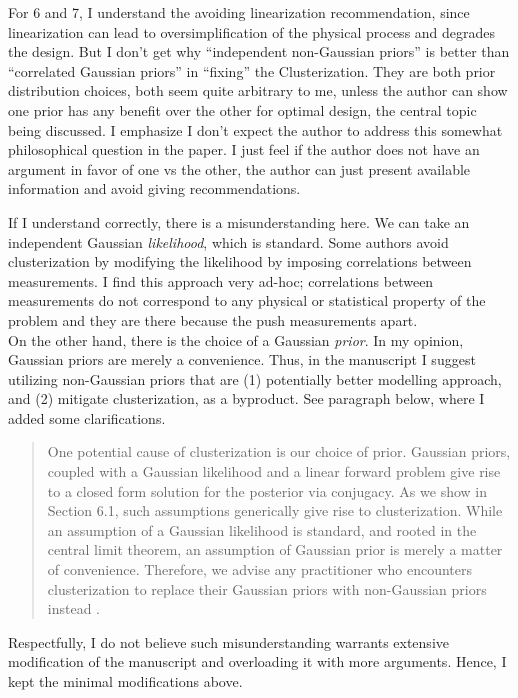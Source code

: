 \documentclass{ar2rc}
\begin{document}
\RC For 6 and 7, I understand the avoiding linearization
recommendation, since linearization can lead to oversimplification of
the physical process and degrades the design. But I don’t get why
“independent non-Gaussian priors” is better than “correlated Gaussian
priors” in “fixing” the Clusterization. They are both prior
distribution choices, both seem quite arbitrary to me, unless the
author can show one prior has any benefit over the other for optimal
design, the central topic being discussed. I emphasize I don’t expect
the author to address this somewhat philosophical question in the
paper. I just feel if the author does not have an argument in favor of
one vs the other, the author can just present available information
and avoid giving recommendations.


\AR If I understand correctly, there is a misunderstanding here. We
can take an independent Gaussian \emph{likelihood}, which is
standard. Some authors avoid clusterization by modifying the
likelihood by imposing correlations between measurements. I find this
approach very ad-hoc; correlations between measurements do not
correspond to any physical or statistical property of the problem and
they are there because the push measurements apart.  \\
\newline
On the other hand, there is the choice of a Gaussian \emph{prior}. In
my opinion, Gaussian priors are merely a convenience. Thus, in the
manuscript I suggest utilizing non-Gaussian priors that are (1)
potentially better modelling approach, and (2) mitigate
clusterization, as a byproduct. See paragraph below, where I added
some clarifications.
\begin{quote}
  One potential cause of clusterization is our choice of
  prior. Gaussian priors, coupled with a Gaussian likelihood and a
  linear forward problem give rise to a closed form solution for the
  posterior via conjugacy. As we show in Section 6.1, such assumptions
  generically give rise to clusterization. While an assumption of a
  Gaussian likelihood \DIFaddbegin {}\DIFaddend is standard, and rooted in the central limit
  theorem, an assumption of Gaussian prior is merely a matter of
  convenience. Therefore, we advise any practitioner who encounters
  clusterization to replace their Gaussian priors with non-Gaussian
  priors instead \cite{hosseini2017, hosseini2019}\DIFaddbegin
  \DIFaddend .
\end{quote}
Respectfully, I do not believe such misunderstanding warrants
extensive modification of the manuscript and overloading it with more
arguments. Hence, I kept the minimal modifications above.
\end{document}
